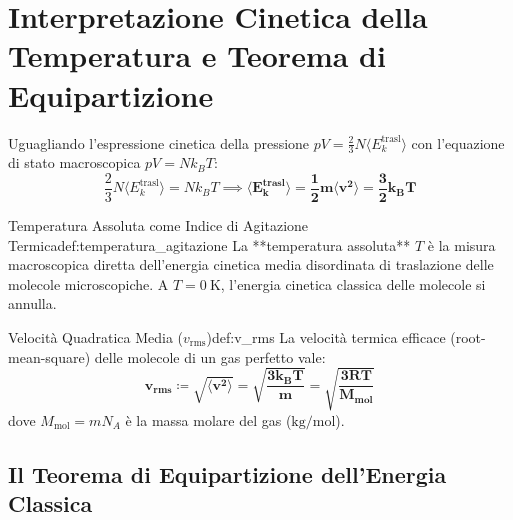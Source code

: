 \section{Interpretazione Cinetica della Temperatura e Teorema di Equipartizione}
\label{sec:temperatura_cinetica}

Uguagliando l'espressione cinetica della pressione $p V = \frac{2}{3} N \langle E_k^{\text{trasl}}\rangle$ con l'equazione di stato macroscopica $p V = N k_B T$:
\begin{equation}
    \frac{2}{3} N \langle E_k^{\text{trasl}}\rangle = N k_B T \implies \mathbf{\langle E_k^{\text{trasl}}\rangle = \frac{1}{2}m\langle v^2 \rangle = \frac{3}{2}k_B T}
    \label{eq:temperatura_traslazionale}
\end{equation}

\begin{definizione}{Temperatura Assoluta come Indice di Agitazione Termica}{def:temperatura_agitazione}
La **temperatura assoluta** $T$ è la misura macroscopica diretta dell'energia cinetica media disordinata di traslazione delle molecole microscopiche. A $T = \SI{0}{\kelvin}$, l'energia cinetica classica delle molecole si annulla.
\end{definizione}

\begin{definizione}{Velocità Quadratica Media ($v_{\text{rms}}$)}{def:v_rms}
La velocità termica efficace (root-mean-square) delle molecole di un gas perfetto vale:
\begin{equation}
    \mathbf{v_{\text{rms}} \coloneqq \sqrt{\langle v^2 \rangle} = \sqrt{\frac{3 k_B T}{m}} = \sqrt{\frac{3 R T}{M_{\text{mol}}}}}
    \label{eq:v_rms}
\end{equation}
dove $M_{\text{mol}} = m N_A$ è la massa molare del gas ($\si{\kilogram\per\mole}$).
\end{definizione}

\subsection{Il Teorema di Equipartizione dell'Energia Classica}

